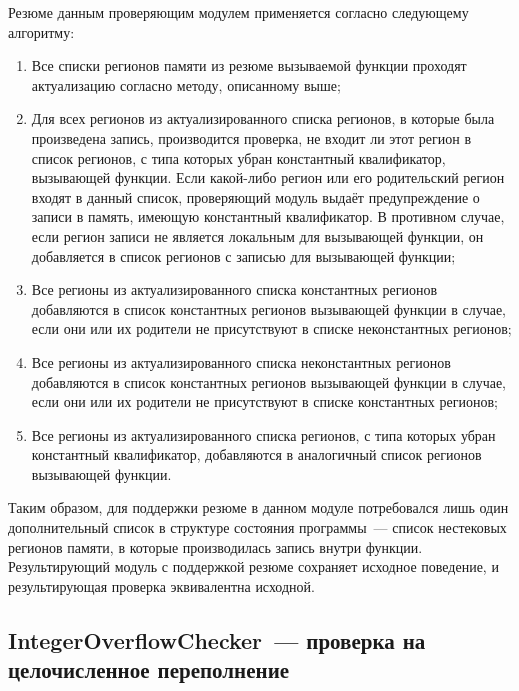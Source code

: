 Резюме данным проверяющим модулем применяется согласно следующему алгоритму:

\begin{enumerate}
 \item Все списки регионов памяти из резюме вызываемой функции проходят актуализацию согласно методу, описанному выше;
 \item Для всех регионов из актуализированного списка регионов, в которые была произведена запись, производится проверка, не входит ли этот регион в список регионов, с типа которых убран константный квалификатор, вызывающей функции. Если какой-либо регион или его родительский регион входят в данный список, проверяющий модуль выдаёт предупреждение о записи в память, имеющую константный квалификатор. В противном случае, если регион записи не является локальным для вызывающей функции, он добавляется в список регионов с записью для вызывающей функции;
 \item Все регионы из актуализированного списка константных регионов добавляются в список константных регионов вызывающей функции в случае, если они или их родители не присутствуют в списке неконстантных регионов;
 \item Все регионы из актуализированного списка неконстантных регионов добавляются в список константных регионов вызывающей функции в случае, если они или их родители не присутствуют в списке константных регионов;
 \item Все регионы из актуализированного списка регионов, с типа которых убран константный квалификатор, добавляются в аналогичный список регионов вызывающей функции.
\end{enumerate}

Таким образом, для поддержки резюме в данном модуле потребовался лишь один дополнительный список в структуре состояния программы~--- список нестековых регионов памяти, в которые производилась запись внутри функции. Результирующий модуль с поддержкой резюме сохраняет исходное поведение, и результирующая проверка эквивалентна исходной.

\subsection{IntegerOverflowChecker~--- проверка на целочисленное переполнение}

